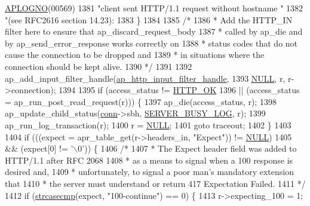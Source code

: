 \begin{DoxyCode}
{{      \hyperlink{group__APACHE__CORE__LOG_ga1dee8a07e06bc5b3de8b89662c2cd666}{APLOGNO}(00569)
1381                       \textcolor{stringliteral}{"client sent HTTP/1.1 request without hostname "}
1382                       \textcolor{stringliteral}{"(see RFC2616 section 14.23): %
1383     \}
1384 
1385     \textcolor{comment}{/*}
1386 \textcolor{comment}{     * Add the HTTP\_IN filter here to ensure that ap\_discard\_request\_body}
1387 \textcolor{comment}{     * called by ap\_die and by ap\_send\_error\_response works correctly on}
1388 \textcolor{comment}{     * status codes that do not cause the connection to be dropped and}
1389 \textcolor{comment}{     * in situations where the connection should be kept alive.}
1390 \textcolor{comment}{     */}
1391 
1392     ap\_add\_input\_filter\_handle(\hyperlink{group__MOD__CORE_gaeb746d5b6cdbaa812be4a7f25430cc02}{ap\_http\_input\_filter\_handle},
1393                                \hyperlink{pcre_8txt_ad7f989d16aa8ca809a36bc392c07fba1}{NULL}, r, r->connection);
1394 
1395     \textcolor{keywordflow}{if} (access\_status != \hyperlink{group__HTTP__Status_ga02e6d59009dee759528ec81fc9a8eeff}{HTTP\_OK}
1396         || (access\_status = ap\_run\_post\_read\_request(r))) \{
1397         ap\_die(access\_status, r);
1398         ap\_update\_child\_status(\hyperlink{group__MOD__PROXY_gaaf2a99e7e3709d3e41bf0a33f1004b4e}{conn}->sbh, \hyperlink{scoreboard_8h_a27a5c403b65794dc90e380a76a500924}{SERVER\_BUSY\_LOG}, r);
1399         ap\_run\_log\_transaction(r);
1400         r = \hyperlink{pcre_8txt_ad7f989d16aa8ca809a36bc392c07fba1}{NULL};
1401         \textcolor{keywordflow}{goto} traceout;
1402     \}
1403 
1404     \textcolor{keywordflow}{if} (((expect = apr\_table\_get(r->headers\_in, \textcolor{stringliteral}{"Expect"})) != \hyperlink{pcre_8txt_ad7f989d16aa8ca809a36bc392c07fba1}{NULL})
1405         && (expect[0] != \textcolor{charliteral}{'\(\backslash\)0'})) \{
1406         \textcolor{comment}{/*}
1407 \textcolor{comment}{         * The Expect header field was added to HTTP/1.1 after RFC 2068}
1408 \textcolor{comment}{         * as a means to signal when a 100 response is desired and,}
1409 \textcolor{comment}{         * unfortunately, to signal a poor man's mandatory extension that}
1410 \textcolor{comment}{         * the server must understand or return 417 Expectation Failed.}
1411 \textcolor{comment}{         */}
1412         \textcolor{keywordflow}{if} (\hyperlink{apr__cpystrn_8c_a4a00fc29b96a953fed9e0107a9c4548a}{strcasecmp}(expect, \textcolor{stringliteral}{"100-continue"}) == 0) \{
1413             r->expecting\_100 = 1;
}}}
\end{DoxyCode}
